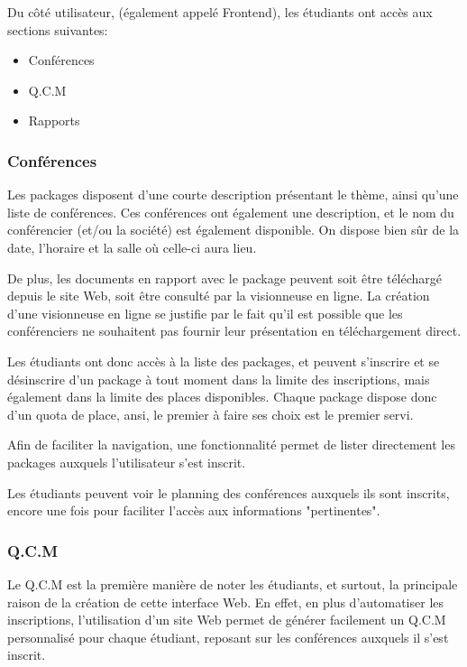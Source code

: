 Du côté utilisateur, (également appelé Frontend), les étudiants ont accès aux sections suivantes:

    \begin{itemize}
    \item Conférences
    \item Q.C.M
    \item Rapports
    \end{itemize}

            \subsubsection{Conférences}

Les packages disposent d'une courte description présentant le thème, ainsi qu'une liste de conférences.
Ces conférences ont également une description, et le nom du conférencier (et/ou la société) est également disponible.
On dispose bien sûr de la date, l'horaire et la salle où celle-ci aura lieu.

De plus, les documents en rapport avec le package peuvent soit être téléchargé depuis le site Web,
soit être consulté par la visionneuse en ligne. La création d'une visionneuse en ligne se justifie par le fait
qu'il est possible que les conférenciers ne souhaitent pas fournir leur présentation en téléchargement direct.

Les étudiants ont donc accès à la liste des packages, et peuvent s'inscrire et se désinscrire
d'un package à tout moment dans la limite des inscriptions, mais également dans la limite des places disponibles.
Chaque package dispose donc d'un quota de place, ansi, le premier à faire ses choix est le premier servi.

Afin de faciliter la navigation, une fonctionnalité permet de lister directement les packages auxquels l'utilisateur
s'est inscrit.

Les étudiants peuvent voir le planning des conférences auxquels ils sont inscrits, encore une fois pour faciliter l'accès
aux informations "pertinentes".

            \subsubsection{Q.C.M}

Le Q.C.M est la première manière de noter les étudiants, et surtout, la principale raison de la création de cette interface Web.
En effet, en plus d'automatiser les inscriptions, l'utilisation d'un site Web permet de générer facilement un Q.C.M
personnalisé pour chaque étudiant, reposant sur les conférences auxquels il s'est inscrit.

